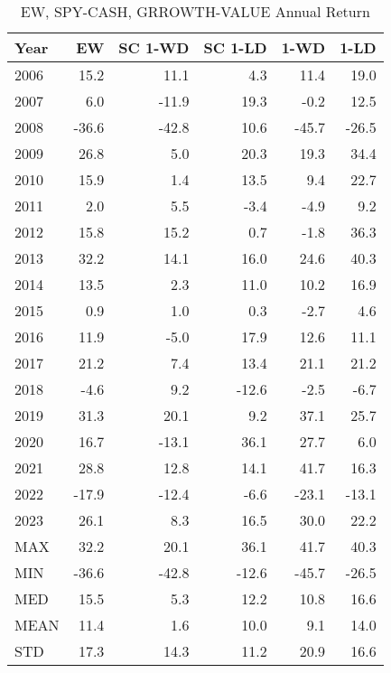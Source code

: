 \documentclass{article}
\begin{document}
\begin{table}[!ht]
    \centering
    \caption{EW, SPY-CASH, GRROWTH-VALUE Annual Return}
\begin{tabular}{lrrrrr}
\hline
Year & EW & SC 1-WD  & SC 1-LD & 1-WD & 1-LD \\
\hline
2006 & 15.2 & 11.1 & \cellcolor{red!25}4.3 & 11.4 & \cellcolor{green!25}19.0 \\
2007 & 6.0 & \cellcolor{red!25}-11.9 & \cellcolor{green!25}19.3 & -0.2 & 12.5 \\
2008 & -36.6 & -42.8 & \cellcolor{green!25}10.6 & \cellcolor{red!25}-45.7 & -26.5 \\
2009 & 26.8 & \cellcolor{red!25}5.0 & 20.3 & 19.3 & \cellcolor{green!25}34.4 \\
2010 & 15.9 & \cellcolor{red!25}1.4 & 13.5 & 9.4 & \cellcolor{green!25}22.7 \\
2011 & 2.0 & 5.5 & -3.4 & \cellcolor{red!25}-4.9 & \cellcolor{green!25}9.2 \\
2012 & 15.8 & 15.2 & 0.7 & \cellcolor{red!25}-1.8 & \cellcolor{green!25}36.3 \\
2013 & 32.2 & \cellcolor{red!25}14.1 & 16.0 & 24.6 & \cellcolor{green!25}40.3 \\
2014 & 13.5 & \cellcolor{red!25}2.3 & 11.0 & 10.2 & \cellcolor{green!25}16.9 \\
2015 & 0.9 & 1.0 & 0.3 & \cellcolor{red!25}-2.7 & \cellcolor{green!25}4.6 \\
2016 & 11.9 & \cellcolor{red!25}-5.0 & \cellcolor{green!25}17.9 & 12.6 & 11.1 \\
2017 & \cellcolor{green!25}21.2 & \cellcolor{red!25}7.4 & 13.4 & 21.1 & 21.2 \\
2018 & -4.6 & \cellcolor{green!25}9.2 & \cellcolor{red!25}-12.6 & -2.5 & -6.7 \\
2019 & 31.3 & 20.1 & \cellcolor{red!25}9.2 & \cellcolor{green!25}37.1 & 25.7 \\
2020 & 16.7 & \cellcolor{red!25}-13.1 & \cellcolor{green!25}36.1 & 27.7 & 6.0 \\
2021 & 28.8 & \cellcolor{red!25}12.8 & 14.1 & \cellcolor{green!25}41.7 & 16.3 \\
2022 & -17.9 & -12.4 & \cellcolor{green!25}-6.6 & \cellcolor{red!25}-23.1 & -13.1 \\
2023 & 26.1 & \cellcolor{red!25}8.3 & 16.5 & \cellcolor{green!25}30.0 & 22.2 \\
\hline
MAX & 32.2 & \cellcolor{red!25}20.1 & 36.1 & \cellcolor{green!25}41.7 & 40.3 \\
MIN & -36.6 & -42.8 & \cellcolor{green!25}-12.6 & \cellcolor{red!25}-45.7 & -26.5 \\
MED & 15.5 & \cellcolor{red!25}5.3 & 12.2 & 10.8 & \cellcolor{green!25}16.6 \\
MEAN & 11.4 & \cellcolor{red!25}1.6 & 10.0 & 9.1 & \cellcolor{green!25}14.0 \\
STD & 17.3 & 14.3 & \cellcolor{red!25}11.2 & \cellcolor{green!25}20.9 & 16.6 \\
\hline
\end{tabular}
\end{table}
\end{document}
